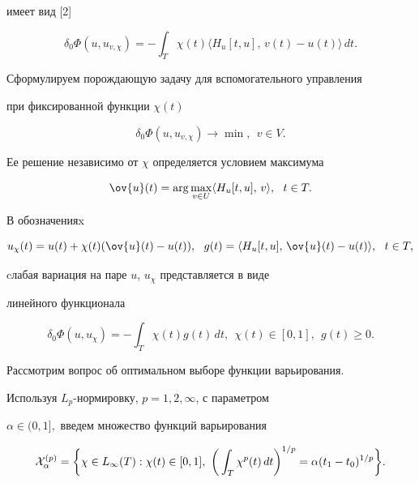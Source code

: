 имеет вид [2]


$$


\delta_{0} \Phi(u, u_{v, \chi}) =


- \int_{T} \chi(t) \langle H_{u}[t,u],\,v(t) - u(t)\rangle\,dt.


$$





Сформулируем порождающую задачу для вспомогательного управления


при фиксированной функции $\chi(t)$


$$


\delta_{0} \Phi(u, u_{v, \chi}) \rightarrow \min,\ \ v \in V.


$$


Ее решение независимо от $\chi$ определяется условием максимума


$$


\ov{u}(t) = \arg\max_{v \in U} \langle H_{u}[t,u],\,v\rangle,\ \ t \in T.


$$


В обозначенияx


$$


u_{\chi}(t) = u(t) + \chi(t)(\ov{u}(t) - u(t)),\ \ 


g(t) = \langle H_{u}[t,u],\,\ov{u}(t) - u(t)\rangle,\ \ t \in T,


$$


cлабая вариация на паре $u$, $u_{\chi}$ представляется в виде


линейного функционала


$$


\delta_{0} \Phi(u, u_{\chi}) =


- \int_{T} \chi(t)g(t)\,dt,\ \ \chi(t) \in [0, 1],\ \ g(t) \geq 0.


$$





Рассмотрим вопрос об оптимальном выборе функции варьирования.


Используя $L_{p}$-нор\-ми\-ров\-ку, $p = 1, 2, \infty$, с параметром


$\alpha \in (0, 1],$ введем множество функций варьирования


\begin{equation}


{\cal X}_{\alpha}^{(p)} =


\bigg\{ \chi \in L_{\infty}(T): \chi(t) \in [0, 1], 


\ \bigg(\int_{T} \chi^{p}(t)\,dt\bigg)^{1/p} =


\alpha (t_{1} - t_{0})^{1/p}\bigg\}.


\end{equation}



